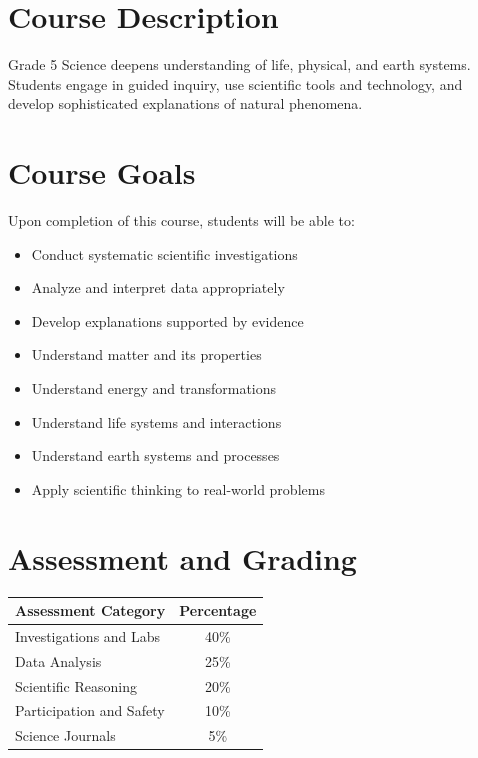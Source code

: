 \documentclass[11pt,letterpaper]{report}
\begin{document}
\section{Course Description}

Grade 5 Science deepens understanding of life, physical, and earth systems. Students engage in guided inquiry, use scientific tools and technology, and develop sophisticated explanations of natural phenomena.

\section{Course Goals}

Upon completion of this course, students will be able to:

\begin{itemize}
    \item Conduct systematic scientific investigations
    \item Analyze and interpret data appropriately
    \item Develop explanations supported by evidence
    \item Understand matter and its properties
    \item Understand energy and transformations
    \item Understand life systems and interactions
    \item Understand earth systems and processes
    \item Apply scientific thinking to real-world problems
\end{itemize}

\section{Assessment and Grading}

\begin{center}
\begin{tabular}{|l|c|}
\hline
\textbf{Assessment Category} & \textbf{Percentage} \\
\hline
Investigations and Labs & 40\% \\
\hline
Data Analysis & 25\% \\
\hline
Scientific Reasoning & 20\% \\
\hline
Participation and Safety & 10\% \\
\hline
Science Journals & 5\% \\
\hline
\end{tabular}
\end{center}
\end{document}
